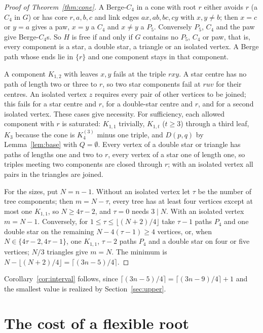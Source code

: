 \documentclass[11pt]{article}
\theoremstyle{remark}
\begin{document}
\begin{proof}[Proof of Theorem~\ref{thm:cone}]
A Berge-$C_4$ in a cone with root $r$ either avoids $r$ (a $C_4$ in $G$)
or has core $r,a,b,c$ and link edges $ax,ab,bc,cy$ with $x,y\ne b$; then
$x=c$ or $y=a$ gives a paw, $x=y$ a $C_4$ and $x\ne y$ a $P_5$. Conversely
$P_5$, $C_4$ and the paw give Berge-$C_4$s. So $H$ is free if and only if
$G$ contains no $P_5$, $C_4$ or paw, that is, every component is a star,
a double star, a triangle or an isolated vertex. A Berge path whose ends
lie in $\{r\}$ and one component stays in that component.

A component $K_{1,2}$ with leaves $x,y$ fails at the triple $rxy$. A star
centre has no path of length two or three to $r$, so two star components
fail at $ruv$ for their centres. An isolated vertex $z$ requires every pair
of other vertices to be joined; this fails for a star centre and $r$, for
a double-star centre and $r$, and for a second isolated vertex. These
cases give necessity. For sufficiency, each allowed component with $r$ is
saturated: $K_{1,1}$ trivially, $K_{1,t}$ ($t\ge3$) through a third leaf,
$K_3$ because the cone is $K_4^{(3)}$ minus one triple, and $D(p,q)$ by
Lemma~\ref{lem:base} with $Q=\emptyset$. Every vertex of a double star or
triangle has paths of lengths one and two to $r$, every vertex of a star
one of length one, so triples meeting two components are closed through
$r$; with an isolated vertex all pairs in the triangles are joined.

For the sizes, put $N=n-1$. Without an isolated vertex let $\tau$ be the
number of tree components; then $m=N-\tau$, every tree has at least four
vertices except at most one $K_{1,1}$, so $N\ge4\tau-2$, and $\tau=0$
needs $3\mid N$. With an isolated vertex $m=N-1$. Conversely, for $1\le
\tau\le\lfloor(N+2)/4\rfloor$ take $\tau-1$ paths $P_4$ and one double
star on the remaining $N-4(\tau-1)\ge4$ vertices, or, when $N\in\{4\tau-2,
4\tau-1\}$, one $K_{1,1}$, $\tau-2$ paths $P_4$ and a double star on four
or five vertices; $N/3$ triangles give $m=N$. The minimum is
$N-\lfloor(N+2)/4\rfloor=\lceil(3n-5)/4\rceil$.
\end{proof}

Corollary~\ref{cor:interval} follows, since
$\lceil(3n-5)/4\rceil=\lceil(3n-9)/4\rceil+1$ and the smallest value is
realized by Section~\ref{sec:upper}.

\section{The cost of a flexible root}\label{sec:root}
\end{document}
